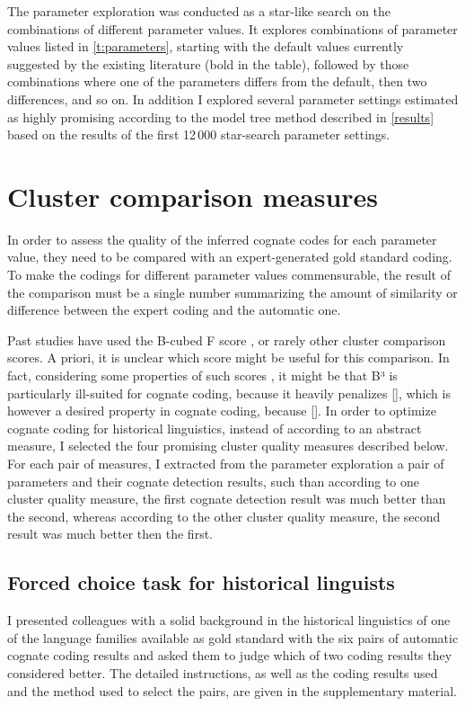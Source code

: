 \documentclass[a4paper,11pt,twocolumn]{scrartcl}
\begin{document}
The parameter exploration was conducted as a star-like search on the
combinations of different parameter values. It explores combinations of
parameter values listed in \cref{t:parameters}, starting with the default values
currently suggested by the existing literature (bold in the table), followed by
those combinations where one of the parameters differs from the default, then
two differences, and so on. In addition I explored several parameter settings
estimated as highly promising according to the model tree method described in
\cref{results} based on the results of the first 12\,000 star-search parameter
settings.

\section{Cluster comparison measures}
\label{evaluation}

In order to assess the quality of the inferred cognate codes for each parameter
value, they need to be compared with an expert-generated gold standard coding.
To make the codings for different parameter values commensurable, the result of
the comparison must be a single number summarizing the amount of similarity or
difference between the expert coding and the automatic one.

Past studies have used the B-cubed F score \parencite{}, or rarely other cluster
comparison scores. A priori, it is unclear which score might be useful for this
comparison. In fact, considering some properties of such scores \parencite{}, it
might be that B³ is particularly ill-suited for cognate coding, because it
heavily penalizes [], which is however a desired property in cognate coding,
because []. In order to optimize cognate coding for historical linguistics,
instead of according to an abstract measure, I selected the four promising
cluster quality measures described below. For each pair of measures, I extracted
from the parameter exploration a pair of parameters and their cognate detection
results, such than according to one cluster quality measure, the first cognate
detection result was much better than the second, whereas according to the other
cluster quality measure, the second result was much better then the first.

\subsection{Forced choice task for historical linguists}
\label{histling}
I presented colleagues with a solid background in the historical linguistics of
one of the language families available as gold standard with the six pairs of
automatic cognate coding results and asked them to judge which of two coding
results they considered better. The detailed instructions, as well as the coding
results used and the method used to select the pairs, are given in the
supplementary material.
\end{document}
